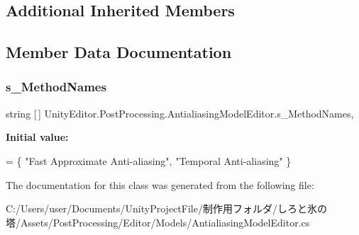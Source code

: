 \subsection*{Additional Inherited Members}


\subsection{Member Data Documentation}
\mbox{\label{class_unity_editor_1_1_post_processing_1_1_antialiasing_model_editor_a4cbc5474b07d0cb92bc65b94f08beb15}} 
\subsubsection{\texorpdfstring{s\+\_\+\+Method\+Names}{s\_MethodNames}}
{\footnotesize\ttfamily string \mbox{[}$\,$\mbox{]} Unity\+Editor.\+Post\+Processing.\+Antialiasing\+Model\+Editor.\+s\+\_\+\+Method\+Names\hspace{0.3cm}{\ttfamily [static]}, {\ttfamily [private]}}

{\bfseries Initial value\+:}
\begin{DoxyCode}
=
        \{
            \textcolor{stringliteral}{"Fast Approximate Anti-aliasing"},
            \textcolor{stringliteral}{"Temporal Anti-aliasing"}
        \}
\end{DoxyCode}


The documentation for this class was generated from the following file\+:\begin{DoxyCompactItemize}
\item 
C\+:/\+Users/user/\+Documents/\+Unity\+Project\+File/制作用フォルダ/しろと氷の塔/\+Assets/\+Post\+Processing/\+Editor/\+Models/Antialiasing\+Model\+Editor.\+cs\end{DoxyCompactItemize}
